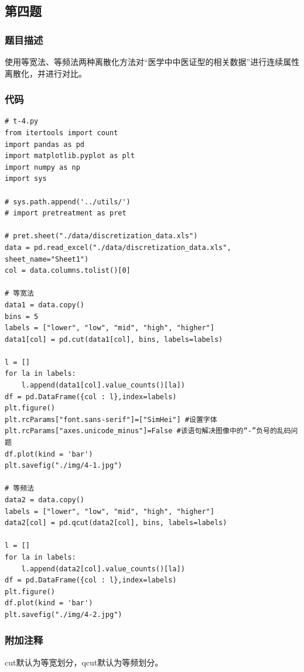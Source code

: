 \documentclass{article}
\begin{document}
    \subsection{第四题}
        \subsubsection{题目描述}
            使用等宽法、等频法两种离散化方法对“医学中中医证型的相关数据”进行连续属性离散化，并进行对比。
        \subsubsection{代码}
            \begin{lstlisting}
# t-4.py
from itertools import count
import pandas as pd
import matplotlib.pyplot as plt
import numpy as np
import sys

# sys.path.append('../utils/')
# import pretreatment as pret

# pret.sheet("./data/discretization_data.xls")
data = pd.read_excel("./data/discretization_data.xls", sheet_name="Sheet1")
col = data.columns.tolist()[0]

# 等宽法
data1 = data.copy()
bins = 5
labels = ["lower", "low", "mid", "high", "higher"]
data1[col] = pd.cut(data1[col], bins, labels=labels)

l = []
for la in labels:
    l.append(data1[col].value_counts()[la])
df = pd.DataFrame({col : l},index=labels)
plt.figure()
plt.rcParams["font.sans-serif"]=["SimHei"] #设置字体
plt.rcParams["axes.unicode_minus"]=False #该语句解决图像中的“-”负号的乱码问题
df.plot(kind = 'bar')
plt.savefig("./img/4-1.jpg")

# 等频法
data2 = data.copy()
labels = ["lower", "low", "mid", "high", "higher"]
data2[col] = pd.qcut(data2[col], bins, labels=labels)

l = []
for la in labels:
    l.append(data2[col].value_counts()[la])
df = pd.DataFrame({col : l},index=labels)
plt.figure()
df.plot(kind = 'bar')
plt.savefig("./img/4-2.jpg")
            \end{lstlisting}
        \subsubsection{附加注释}
            cut默认为等宽划分，qcut默认为等频划分。
\end{document}
